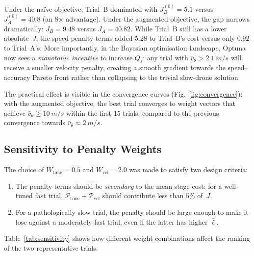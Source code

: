 Under the na\"ive objective, Trial~B dominated with
$J^{(0)}_B = 5.1$ versus $J^{(0)}_A = 40.8$ (an 8$\times$
advantage).
Under the augmented objective, the gap narrows dramatically:
$J_B = 9.48$ versus $J_A = 40.82$.
While Trial~B still has a lower absolute~$J$, the
speed penalty terms added $5.28$ to Trial~B's cost
versus only $0.92$ to Trial~A's.
More importantly, in the Bayesian optimisation landscape,
Optuna now sees a \emph{monotonic incentive} to increase
$Q_s$: any trial with $\bar{v}_\theta > \SI{2.1}{m/s}$
will receive a smaller velocity penalty, creating a smooth
gradient towards the speed--accuracy Pareto front rather
than collapsing to the trivial slow-drone solution.

The practical effect is visible in the convergence curves
(Fig.~\ref{fig:convergence}): with the augmented objective,
the best trial converges to weight vectors that achieve
$\bar{v}_\theta \ge \SI{10}{m/s}$ within the first 15
trials, compared to the previous convergence towards
$\bar{v}_\theta \approx \SI{2}{m/s}$.


\subsection{Sensitivity to Penalty Weights}
\label{sec:sensitivity}

The choice of $W_{\text{time}} = 0.5$ and $W_{\text{vel}} = 2.0$
was made to satisfy two design criteria:
%
\begin{enumerate}
  \item The penalty terms should be \emph{secondary} to the
    mean stage cost: for a well-tuned fast trial,
    $\mathcal{P}_{\text{time}} + \mathcal{P}_{\text{vel}}$
    should contribute less than $5\%$ of~$J$.
  \item For a pathologically slow trial, the penalty should
    be large enough to make it lose against a moderately
    fast trial, even if the latter has higher $\bar\ell$.
\end{enumerate}
%
Table~\ref{tab:sensitivity} shows how different weight
combinations affect the ranking of the two representative trials.

